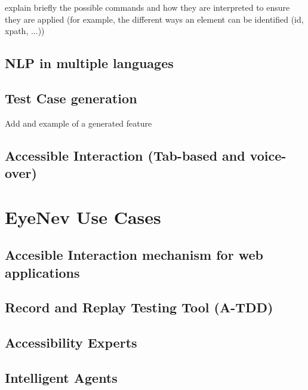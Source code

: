 explain briefly the possible commands and how they are interpreted to ensure they are applied (for example, the different ways an element can be identified (id, xpath, ...))

\subsection{NLP in multiple languages}

\subsection{Test Case generation}

Add and example of a generated feature

\subsection{Accessible Interaction (Tab-based and voice-over)}

\section{EyeNev Use Cases}


\subsection{Accesible Interaction mechanism for web applications}

\subsection{Record and Replay Testing Tool (A-TDD)}

\subsection{Accessibility Experts}

\subsection{Intelligent Agents}

